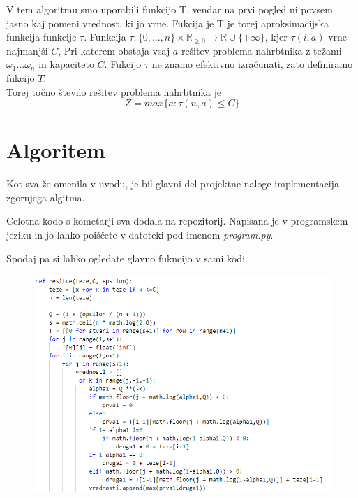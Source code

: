 \documentclass[a4paper,12pt]{article}
\begin{document}
\vspace{3mm}
\noindent V tem algoritmu smo uporabili funkcijo T, vendar na prvi pogled ni povsem jasno kaj pomeni vrednost, ki jo vrne. Fukcija  je T je torej aproksimacijska funkcija funkcije $\tau$.  Funkcija $\tau :  \{0, \ldots, n\} \times \mathbb{R}_{\geq 0}  \rightarrow \mathbb{R} \cup \{\pm \infty \} $, kjer $\tau (i,a )$ vrne najmanjši $C$, Pri katerem obstaja vsaj $a$ rešitev problema nahrbtnika z težami $ \omega_{1} \ldots \omega_{n}$ in kapaciteto $C$. Fukcijo $\tau$ ne znamo efektivno izračunati, zato definiramo fukcijo $T$. \\
 

\noindent Torej točno število rešitev problema nahrbtnika je $$Z= max\{a: \tau (n,a) \leq C\} $$

\newpage
\section{Algoritem}

\noindent Kot sva že omenila v uvodu, je bil glavni del projektne naloge implementacija zgornjega algitma.
\vspace{3mm}

\noindent Celotna kodo s kometarji  sva dodala na repozitorij. Napisana je v programskem jeziku in jo  lahko poiščete v datoteki 
pod imenom \textit{program.py}.

\vspace{3mm}
\noindent Spodaj pa si lahko ogledate glavno fukncijo v sami kodi.

\vspace{5mm}
\begin{figure}[h]
\centering
\includegraphics[width=1.0\textwidth]{koda1}
\end{figure}
\end{document}
